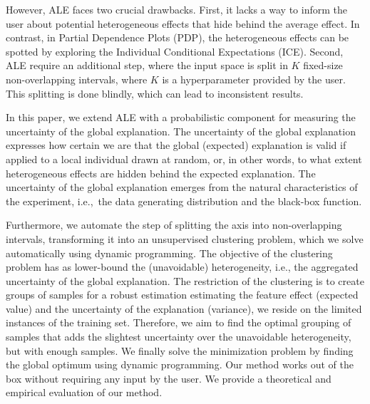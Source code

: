 \documentclass{article}
\begin{document}
However, ALE faces two crucial drawbacks. First, it lacks a way to inform the user about potential heterogeneous effects that hide behind the average effect. In contrast, in Partial Dependence Plots (PDP), the heterogeneous effects can be spotted by exploring the Individual Conditional Expectations (ICE). Second, ALE require an additional step, where the input space is split in \(K\) fixed-size non-overlapping intervals, where \(K\) is a hyperparameter provided by the user. This splitting is done blindly, which can lead to inconsistent results.

In this paper, we extend ALE with a probabilistic component for measuring the uncertainty of the global explanation. The uncertainty of the global explanation expresses how certain we are that the global (expected) explanation is valid if applied to a local individual drawn at random, or, in other words, to what extent heterogeneous effects are hidden behind the expected explanation. The uncertainty of the global explanation emerges from the natural characteristics of the experiment, i.e.,~the data generating distribution and the black-box function.

Furthermore, we automate the step of splitting the axis into non-overlapping intervals, transforming it into an unsupervised clustering problem, which we solve automatically using dynamic programming. The objective of the clustering problem has as lower-bound the (unavoidable) heterogeneity, i.e., the aggregated uncertainty of the global explanation.
The restriction of the clustering is to create groups of samples for a robust estimation estimating the feature effect  (expected value) and the uncertainty of the explanation (variance), we reside on the limited instances of the training set. Therefore, we aim to find the optimal grouping of samples that adds the slightest uncertainty over the unavoidable heterogeneity, but with enough samples. We finally solve the minimization problem by finding the global optimum using dynamic programming. Our method works out of the box without requiring any input by the user. We provide a theoretical and empirical evaluation of our method.

\end{document}

